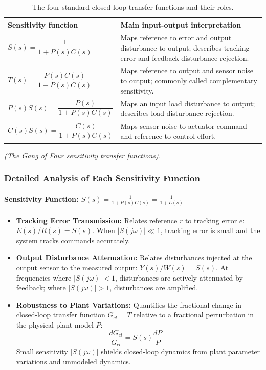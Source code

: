 \documentclass[12pt,onecolumn,twoside ]{article}
\begin{document}
	\begin{table}[H]
		\centering
		\small
		\begin{tabularx}{\textwidth}{>{\raggedright\arraybackslash}X>{\raggedright\arraybackslash}X}
			\toprule
			\textbf{Sensitivity function} & \textbf{Main input-output interpretation}\\
			\midrule
			$S(s)=\dfrac{1}{1+P(s)C(s)}$ & Maps reference to error and output disturbance to output; describes tracking error and feedback disturbance rejection.\\
			$T(s)=\dfrac{P(s)C(s)}{1+P(s)C(s)}$ & Maps reference to output and sensor noise to output; commonly called complementary sensitivity.\\
			$P(s)S(s)=\dfrac{P(s)}{1+P(s)C(s)}$ & Maps an input load disturbance to output; describes load-disturbance rejection.\\
			$C(s)S(s)=\dfrac{C(s)}{1+P(s)C(s)}$ & Maps sensor noise to actuator command and reference to control effort.\\
			\bottomrule
		\end{tabularx}
		\caption{The four standard closed-loop transfer functions and their roles.}
		\label{tab:gang-of-four-roles}
	\end{table}
	\textit{(The Gang of Four sensitivity transfer functions).}
	
	\subsubsection{Detailed Analysis of Each Sensitivity Function}
	\paragraph{Sensitivity Function: $S(s) = \frac{1}{1 + P(s)C(s)} = \frac{1}{1 + L(s)}$}
	\begin{itemize}
		\item
		\textbf{Tracking Error Transmission:} Relates reference $r$ to tracking error $e$: $E(s)/R(s) = S(s)$. When $|S(j\omega)| \ll 1$, tracking error is small and the system tracks commands accurately.
		\item
		\textbf{Output Disturbance Attenuation:} Relates disturbances injected at the output sensor to the measured output: $Y(s)/W(s) = S(s)$. At frequencies where $|S(j\omega)| < 1$, disturbances are actively attenuated by feedback; where $|S(j\omega)| > 1$, disturbances are amplified.
		\item
		\textbf{Robustness to Plant Variations:} Quantifies the fractional change in closed-loop transfer function $G_{cl} = T$ relative to a fractional perturbation in the physical plant model $P$: \[
		\frac{dG_{cl}}{G_{cl}} = S(s) \frac{dP}{P} \quad
		\] Small sensitivity $|S(j\omega)|$ shields closed-loop dynamics from plant parameter variations and unmodeled dynamics.
	\end{itemize}
\end{document}
